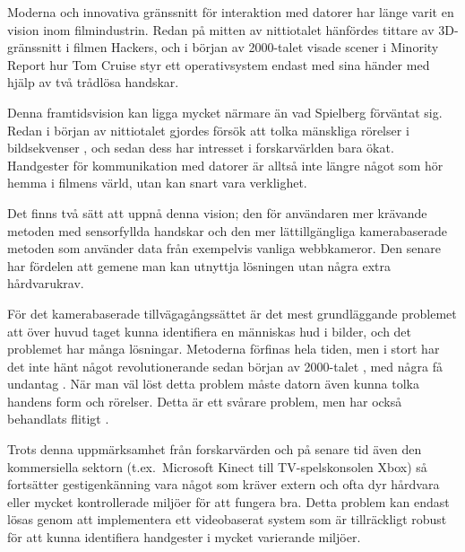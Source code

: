 \documentclass[../rapport_MVEX01-11-05]{subfiles}
\begin{document}
Moderna och innovativa gränssnitt för interaktion med datorer har länge varit
en vision inom filmindustrin. Redan på mitten av nittiotalet hänfördes
tittare av 3D-gränssnitt i filmen Hackers, och i början av 2000-talet visade
scener i Minority Report hur Tom Cruise styr ett operativsystem endast med
sina händer med hjälp av två trådlösa handskar.

Denna framtidsvision kan
ligga mycket närmare än vad Spielberg förväntat sig. Redan i början av
nittiotalet gjordes försök att tolka mänskliga rörelser i bildsekvenser
\cite{Yamato92}, och sedan dess har intresset i forskarvärlden bara ökat.
Handgester för kommunikation med datorer är alltså inte längre något som
hör hemma i filmens värld, utan kan snart vara verklighet.

Det finns två sätt att uppnå denna vision; den för användaren mer krävande
metoden med sensorfyllda handskar och den mer lättillgängliga kamerabaserade
metoden som använder data från exempelvis vanliga webbkameror. Den senare har
fördelen att gemene man kan utnyttja lösningen utan några extra hårdvarukrav.

För det kamerabaserade tillvägagångssättet är det mest grundläggande problemet
att över huvud taget kunna identifiera en människas hud i bilder, och det
problemet har många lösningar. Metoderna förfinas hela tiden, men i stort har
det inte hänt något revolutionerande sedan början av 2000-talet
\cite{Sebe04,Kruppa02,Albiol01,Brand00}, med några få undantag
. När man väl löst detta problem måste datorn
även kunna tolka handens form och rörelser. Detta är ett svårare problem, men
har också behandlats flitigt \cite{Pavlovic97,Garg09,Nielsen04,Zabulis09}.

%

Trots denna uppmärksamhet från forskarvärden och på senare tid även den kommersiella sektorn
 (t.ex.~Microsoft Kinect till TV-spelskonsolen Xbox) så fortsätter
gestigenkänning vara något som
kräver extern och ofta dyr hårdvara eller mycket kontrollerade miljöer för att
fungera bra. Detta problem kan endast lösas genom att implementera ett
videobaserat system som är tillräckligt robust för att kunna identifiera
handgester i mycket varierande miljöer.
\end{document}

